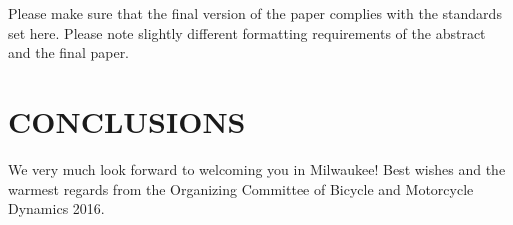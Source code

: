 \documentclass{bmd2016p}
\begin{document}
Please make sure that the final version of the paper complies with the standards set here. Please note slightly different formatting requirements of the abstract and the final paper.

\section{CONCLUSIONS}

We very much look forward to welcoming you in Milwaukee! Best wishes and the 
warmest regards from the Organizing Committee of Bicycle and Motorcycle 
Dynamics 2016.



\end{document}
